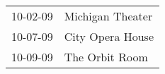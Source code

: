 \begin{supertabular}{p{0.25\columnwidth}p{0.75\columnwidth}}
 10-02-09 &  Michigan Theater \\
 10-07-09 &  City Opera House \\
 10-09-09 &    The Orbit Room \\
\end{supertabular}
